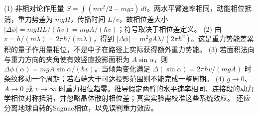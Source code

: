 (1) 非相对论作用量 \(S=\int(mv^2/2-mgz)\,dt\)。两水平臂速率相同，动能相位抵消，重力势差为 \(mgH\)，传播时间 \(L/v\)，故相位差大小 \(|\Delta\phi|=mgHL/(\hbar v)=mgA/(\hbar v)\)；符号取决于相位差定义。
(2) 由 \(v=h/(m\lambda)=2\pi\hbar/(m\lambda)\)，得到 \(|\Delta\phi|=m^2gA\lambda/(2\pi\hbar^2)\)。这是重力势能差累积的量子作用量相位，不是中子在路径上实际获得额外重力势能。
(3) 若面积法向与重力方向的夹角使有效竖直投影面积为 \(A\sin\alpha\)，则 \(\Delta\phi(\alpha)=mgA\sin\alpha/(\hbar v)\)。当倾角变化满足 \(\Delta(\sin\alpha)=2\pi\hbar v/(mgA)\) 时条纹移动一个周期；若右端大于可达投影范围则不能完成一整周期。
(4) \(g\to0\)、\(A\to0\) 或 \(v\to\infty\) 时重力相位趋零。推导假定两臂的水平速率相同、连接段的动力学相位对称抵消，并忽略晶体散射相位差；真实实验需校准这些系统效应。 还应分离地球自转的Sagnac相位，以免误判重力效应。
